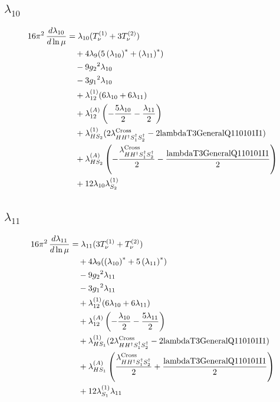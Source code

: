 \documentclass[10pt,a4paper]{article}
\begin{document}
\subsection*{$\lambda_{10}$}
\begin{align*}
16\pi^2\,\frac{d \lambda_{10}}{d\ln\mu} &={\lambda_{10}} (T_{\nu}^{(1)}+3 T_{\nu}^{(2)}) \\
&\quad +4 {\lambda_{9}} (5 \left({\lambda_{10}}\right)^{*}+\left({\lambda_{11}}\right)^{*}) \\
&\quad -9 {g_2}^2 {\lambda_{10}} \\
&\quad -3 {g_1}^2 {\lambda_{10}} \\
&\quad +{\lambda_{12}^{(1)}} (6 {\lambda_{10}}+6 {\lambda_{11}}) \\
&\quad +{\lambda_{12}^{(A)}} \left(-\frac{5 {\lambda_{10}}}{2}-\frac{{\lambda_{11}}}{2}\right) \\
&\quad +{\lambda_{HS_2}^{(1)}} (2 {\lambda_{H H^\dagger S_1^\dagger S_2^\dagger}^{\rm Cross}}-2 \text{lambdaT3GeneralQ110101I1}) \\
&\quad +{\lambda_{HS_2}^{(A)}} \left(-\frac{{\lambda_{H H^\dagger S_1^\dagger S_2^\dagger}^{\rm Cross}}}{2}-\frac{\text{lambdaT3GeneralQ110101I1}}{2}\right) \\
&\quad +12 {\lambda_{10}} {\lambda_{S_2}^{(1)}} \\
\end{align*}
\subsection*{$\lambda_{11}$}
\begin{align*}
16\pi^2\,\frac{d \lambda_{11}}{d\ln\mu} &={\lambda_{11}} (3 T_{\nu}^{(1)}+T_{\nu}^{(2)}) \\
&\quad +4 {\lambda_{9}} (\left({\lambda_{10}}\right)^{*}+5 \left({\lambda_{11}}\right)^{*}) \\
&\quad -9 {g_2}^2 {\lambda_{11}} \\
&\quad -3 {g_1}^2 {\lambda_{11}} \\
&\quad +{\lambda_{12}^{(1)}} (6 {\lambda_{10}}+6 {\lambda_{11}}) \\
&\quad +{\lambda_{12}^{(A)}} \left(-\frac{{\lambda_{10}}}{2}-\frac{5 {\lambda_{11}}}{2}\right) \\
&\quad +{\lambda_{HS_1}^{(1)}} (2 {\lambda_{H H^\dagger S_1^\dagger S_2^\dagger}^{\rm Cross}}-2 \text{lambdaT3GeneralQ110101I1}) \\
&\quad +{\lambda_{HS_1}^{(A)}} \left(\frac{{\lambda_{H H^\dagger S_1^\dagger S_2^\dagger}^{\rm Cross}}}{2}+\frac{\text{lambdaT3GeneralQ110101I1}}{2}\right) \\
&\quad +12 {\lambda_{S_1}^{(1)}} {\lambda_{11}} \\
\end{align*}
\end{document}
